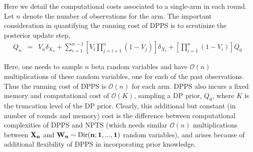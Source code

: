 \documentclass[10pt]{article}
\newcommand{\beqa}{\begin{eqnarray}}
\newcommand{\eeqa}{\end{eqnarray}}
\begin{document}
Here we detail the computational costs associated to a single-arm in each round. Let $n$ denote the number of observations for the arm. The important consideration in quantifying the running cost of DPPS is to scrutinize the posterior update step,
\beqa
\label{eq:multi-step-posterior-appendix}
Q_{n} &=& V_{n}\delta_{X_{n}} + \sum_{i=1}^{n-1}\left[V_{i}\prod_{j=i+1}^{n}(1-V_{j})\right]\delta_{X_{i}} + \left[\prod_{i=1}^{n}(1-V_{i})\right] Q_{0}
\eeqa


Here, one needs to sample $n$ beta random variables and have $\mathcal{O}(n)$ multiplications of these random variables, one for each of the past observations. Thus the running cost of DPPS is $\mathcal{O}(n)$ for each arm. DPPS also incurs a fixed memory and computational cost of $\mathcal{O}(K)$, sampling a DP prior, $Q_{0}$, where $K$ is the truncation level of the DP prior. Clearly, this additional but constant (in number of rounds and memory) cost is the difference between computational complexities of DPPS and NPTS (which needs similar $\mathcal{O}(n)$ multiplications between $\bf{X_{n}}$ and $\bf{W_{n}}\sim\mathrm{Dir}(n;1,. . .,1)$ random variables), and arises because of additional flexibility of DPPS in incorporating prior knowledge. 









\end{document}
